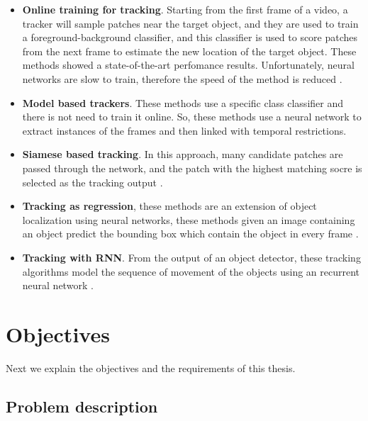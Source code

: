 \documentclass[12pt, a4paper, titlepage,twoside,openright]{article}
\begin{document}
\begin{itemize}


\item \textbf{Online training for tracking}. Starting from the first frame of a video, a tracker will sample patches near the target object, and they are used to train a foreground-background  classifier, and this classifier is used to score patches from the next frame to estimate the new location of the target object. These methods showed a state-of-the-art perfomance results. Unfortunately, neural networks are slow to train, therefore the speed of the method is reduced \cite{deep1} \cite{deep2}.

\item \textbf{Model based trackers}. These methods use a specific class classifier and there is not need to train it online. So, these methods use a neural network to extract instances of the frames and then linked with temporal restrictions. 


\item \textbf{Siamese based tracking}. In this approach, many candidate patches are passed through the network, and the patch with the highest matching socre is selected as the tracking output \cite{trackingSiamese}.


\item \textbf{Tracking as regression}, these methods are an extension of object localization using neural networks, these methods given an image containing an object predict the bounding box which contain the object in every frame \cite{thrun}.


\item \textbf{Tracking with RNN}. From the output of an object detector, these tracking algorithms model the sequence of movement of the objects using an recurrent neural network \cite{savaresee}.


\end{itemize}



\section{Objectives}


Next we explain the objectives and the requirements of this thesis.


\subsection{Problem description}
\end{document}
